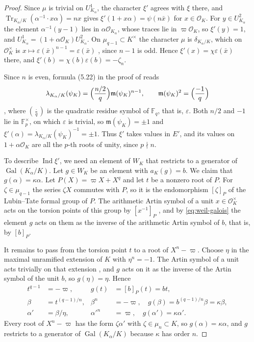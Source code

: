 \documentclass[a4paper,11pt]{amsart}
\theoremstyle{definition}
\theoremstyle{remark}
\numberwithin{equation}{section}
\DeclareMathOperator{\Gal}{Gal}
\DeclareMathOperator{\Tr}{Tr}
\newcommand{\F}{\mathbb{F}}
\DeclareMathOperator{\Ind}{Ind}
\begin{document}
\begin{proof}
Since $\mu$ is trivial on $U^1_{K_\alpha}$, the character $\xi'$ agrees with $\xi$ there, and $\Tr_{K_\alpha/K}(\alpha^{-1}\cdot x\alpha)=nx$ gives $\xi'(1+x\alpha)=\psi(n\bar x)$ for $x\in\mathcal O_K$. For $y\in U^2_{K_\alpha}$ the element $\alpha^{-1}(y-1)$ lies in $\alpha\mathcal O_{K_\alpha}$, whose traces lie in $\varpi\mathcal O_K$, so $\xi'(y)=1$, and $U^1_{K_\alpha}=(1+\alpha\mathcal O_K)U^2_{K_\alpha}$. On $\mu_{q-1}\subset K^\times$ the character $\mu$ is $\delta_{K_\alpha/K}$, which on $\mathcal O_K^\times$ is $x\mapsto\varepsilon(\bar x)^{n-1}=\varepsilon(\bar x)$ \cite[Lemma~5.3]{IT20}, since $n-1$ is odd. Hence $\xi'(x)=\chi\varepsilon(\bar x)$ there, and $\xi'(b)=\chi(b)\varepsilon(b)=-\zeta_n$.

Since $n$ is even, formula (5.22) in the proof of \cite[Proposition~5.15]{IT20} reads
\[
 \lambda_{K_\alpha/K}(\psi_K)=\Bigl(\frac{n/2}{q}\Bigr)\mathfrak m(\psi_K)^{n-1}, \qquad \mathfrak m(\psi_K)^2=\Bigl(\frac{-1}{q}\Bigr)
\]
\cite[(5.18)]{IT20}, where $(\frac{\cdot}{q})$ is the quadratic residue symbol of $\F_q$, that is, $\varepsilon$. Both $n/2$ and $-1$ lie in $\F_p^\times$, on which $\varepsilon$ is trivial, so $\mathfrak m(\psi_K)=\pm1$ and $\xi'(\alpha)=\lambda_{K_\alpha/K}(\psi_K)^{-1}=\pm1$. Thus $\xi'$ takes values in $E'$, and its values on $1+\alpha\mathcal O_K$ are all the $p$-th roots of unity, since $p\nmid n$.

To describe $\Ind\xi'$, we need an element of $W_K$ that restricts to a generator of $\Gal(K_\alpha/K)$. Let $g\in W_K$ be an element with $a_K(g)=b$. We claim that $g(\alpha)=\kappa\alpha$. Let $P(X)=\varpi X+X^q$ and let $t$ be a nonzero root of $P$. For $\zeta\in\mu_{q-1}$ the series $\zeta X$ commutes with $P$, so it is the endomorphism $[\zeta]_P$ of the Lubin--Tate formal group of $P$. The arithmetic Artin symbol of a unit $x\in\mathcal O_K^\times$ acts on the torsion points of this group by $[x^{-1}]_P$ \cite[I, 1.14, 1.15]{Mil20}, and by \eqref{eq:weil-galois} the element $g$ acts on them as the inverse of the arithmetic Artin symbol of $b$, that is, by $[b]_P$.

It remains to pass from the torsion point $t$ to a root of $X^n-\varpi$. Choose $\eta$ in the maximal unramified extension of $K$ with $\eta^n=-1$. The Artin symbol of a unit acts trivially on that extension \cite[I, 1.8]{Mil20}, and $g$ acts on it as the inverse of the Artin symbol of the unit $b$, so $g(\eta)=\eta$. Hence
\[
\begin{aligned}
 t^{q-1}&=-\varpi, & g(t)&=[b]_P(t)=bt,\\
 \beta&=t^{(q-1)/n}, & \beta^n&=-\varpi,\quad g(\beta)=b^{(q-1)/n}\beta=\kappa\beta,\\
 \alpha'&=\beta/\eta, & \alpha'^n&=\varpi,\quad g(\alpha')=\kappa\alpha'.
\end{aligned}
\]
Every root of $X^n-\varpi$ has the form $\zeta\alpha'$ with $\zeta\in\mu_n\subset K$, so $g(\alpha)=\kappa\alpha$, and $g$ restricts to a generator of $\Gal(K_\alpha/K)$ because $\kappa$ has order $n$.


\end{proof}
\end{document}
